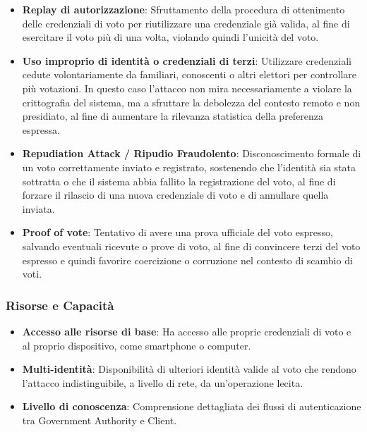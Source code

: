 \documentclass[a4paper,12pt]{article}
\begin{document}
\begin{itemize}
    \item \textbf{Replay di autorizzazione}: Sfruttamento della procedura di ottenimento delle credenziali di voto per riutilizzare una credenziale già valida, al fine di esercitare il voto più di una volta, violando quindi l'unicità del voto.

    \item \textbf{Uso improprio di identità o credenziali di terzi}: Utilizzare credenziali cedute volontariamente da familiari, conoscenti o altri elettori per controllare più votazioni. In questo caso l'attacco non mira necessariamente a violare la crittografia del sistema, ma a sfruttare la debolezza del contesto remoto e non presidiato, al fine di aumentare la rilevanza statistica della preferenza espressa.

    \item \textbf{Repudiation Attack / Ripudio Fraudolento}: Disconoscimento formale di un voto correttamente inviato e registrato, sostenendo che l'identità sia stata sottratta o che il sistema abbia fallito la registrazione del voto, al fine di forzare il rilascio di una nuova credenziale di voto e di annullare quella inviata.

    \item \textbf{Proof of vote}: Tentativo di avere una prova ufficiale del voto espresso, salvando eventuali ricevute o prove di voto, al fine di convincere terzi del voto espresso e quindi favorire coercizione o corruzione nel contesto di scambio di voti.
\end{itemize}

\subsubsection*{Risorse e Capacità}

\begin{itemize}
    \item \textbf{Accesso alle risorse di base}: Ha accesso alle proprie credenziali di voto e al proprio dispositivo, come smartphone o computer.

    \item \textbf{Multi-identità}: Disponibilità di ulteriori identità valide al voto che rendono l'attacco indistinguibile, a livello di rete, da un'operazione lecita.

    \item \textbf{Livello di conoscenza}: Comprensione dettagliata dei flussi di autenticazione tra Government Authority e Client.
\end{itemize}
\end{document}
